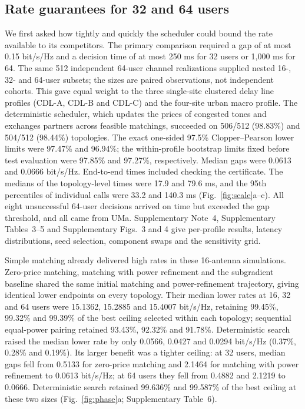 \documentclass[lineno,pdflatex,sn-nature]{sn-jnl}
\begin{document}
\subsection*{Rate guarantees for 32 and 64 users}

We first asked how tightly and quickly the scheduler could bound the rate available to its competitors. The primary comparison required a gap of at most 0.15 bit/s/Hz and a decision time of at most 250 ms for 32 users or 1,000 ms for 64. The same 512 independent 64-user channel realizations supplied nested 16-, 32- and 64-user subsets; the sizes are paired observations, not independent cohorts. This gave equal weight to the three single-site clustered delay line profiles (CDL-A, CDL-B and CDL-C) and the four-site urban macro profile. The deterministic scheduler, which updates the prices of congested tones and exchanges partners across feasible matchings, succeeded on 506/512 (98.83\%) and 504/512 (98.44\%) topologies. The exact one-sided 97.5\% Clopper--Pearson lower limits were 97.47\% and 96.94\%; the within-profile bootstrap limits fixed before test evaluation were 97.85\% and 97.27\%, respectively. Median gaps were 0.0613 and 0.0666 bit/s/Hz. End-to-end times included checking the certificate. The medians of the topology-level times were 17.9 and 79.6 ms, and the 95th percentiles of individual calls were 33.2 and 140.3 ms (Fig.~\ref{fig:scale}a--c). All eight unsuccessful 64-user decisions arrived on time but exceeded the gap threshold, and all came from UMa. Supplementary Note~4, Supplementary Tables~3--5 and Supplementary Figs.~3 and 4 give per-profile results, latency distributions, seed selection, component swaps and the sensitivity grid.


Simple matching already delivered high rates in these 16-antenna simulations. Zero-price matching, matching with power refinement and the subgradient baseline shared the same initial matching and power-refinement trajectory, giving identical lower endpoints on every topology. Their median lower rates at 16, 32 and 64 users were 15.1362, 15.2885 and 15.4007 bit/s/Hz, retaining 99.45\%, 99.32\% and 99.39\% of the best ceiling selected within each topology; sequential equal-power pairing retained 93.43\%, 92.32\% and 91.78\%. Deterministic search raised the median lower rate by only 0.0566, 0.0427 and 0.0294 bit/s/Hz (0.37\%, 0.28\% and 0.19\%). Its larger benefit was a tighter ceiling: at 32 users, median gaps fell from 0.5133 for zero-price matching and 2.1464 for matching with power refinement to 0.0613 bit/s/Hz; at 64 users they fell from 0.4882 and 2.1219 to 0.0666. Deterministic search retained 99.636\% and 99.587\% of the best ceiling at these two sizes (Fig.~\ref{fig:phase}a; Supplementary Table~6).
\end{document}
